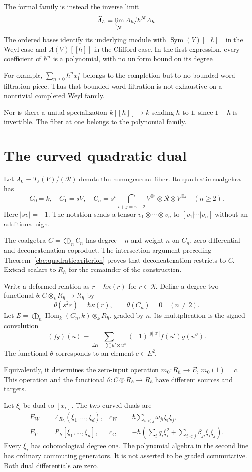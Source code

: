 The formal family is instead the inverse limit
\[
 \widehat A_\hbar=\varprojlim_N A_\hbar/\hbar^N A_\hbar.
\]
The ordered bases identify its underlying module with
$\operatorname{Sym}(V)[[\hbar]]$ in the Weyl case and
$\Lambda(V)[[\hbar]]$ in the Clifford case.
In the first expression, every coefficient of $\hbar^n$ is a polynomial, with no uniform bound on its degree.

For example, $\sum_{n\geq0}\hbar^n x_1^n$ belongs to the completion but to no bounded word-filtration piece.
Thus that bounded-word filtration is not exhaustive on a nontrivial completed Weyl family.

Nor is there a unital specialization $k[[\hbar]]\to k$ sending $\hbar$ to $1$, since $1-\hbar$ is invertible.
The fiber at one belongs to the polynomial family.

\section{The curved quadratic dual}
Let $A_0=T_k(V)/(\mathcal R)$ denote the homogeneous fiber.
Its quadratic coalgebra has
\[
 C_0=k,\quad C_1=sV,\quad
 C_n=s^n\!\bigcap_{i+j=n-2}
       V^{\otimes i}\otimes\mathcal R\otimes V^{\otimes j}
       \quad(n\geq2).
\]
Here $|sv|=-1$.
The notation sends a tensor $v_1\otimes\cdots\otimes v_n$ to $[v_1|\cdots|v_n]$ without an additional sign.

The coalgebra $C=\bigoplus_n C_n$ has degree $-n$ and weight $n$ on $C_n$, zero differential and deconcatenation coproduct.
The intersection argument preceding Theorem~\ref{cbc:quadratic:criterion} proves that deconcatenation restricts to $C$.
Extend scalars to $R_\hbar$ for the remainder of the construction.

Write a deformed relation as $r-\hbar\kappa(r)$ for $r\in\mathcal R$.
Define a degree-two functional $\theta:C\otimes_k R_\hbar\to R_\hbar$ by
\[
 \theta(s^2r)=\hbar\kappa(r),\qquad \theta(C_n)=0\quad(n\ne2).
\]
Let $E=\bigoplus_n\operatorname{Hom}_k(C_n,k)\otimes_k R_\hbar$, graded by $n$.
Its multiplication is the signed convolution
\[
 (fg)(u)=\sum_{\Delta u=\sum u'\otimes u''}
          (-1)^{|g||u'|}f(u')g(u'').
\]
The functional $\theta$ corresponds to an element $c\in E^2$.

Equivalently, it determines the zero-input operation $m_0:R_\hbar\to E$, $m_0(1)=c$.
This operation and the functional $\theta:C\otimes R_\hbar\to R_\hbar$ have different sources and targets.

Let $\xi_i$ be dual to $[x_i]$.
The two curved duals are
\begin{align}
 E_W&=\Lambda_{R_\hbar}(\xi_1,\ldots,\xi_d),&
 c_W&=\hbar\sum_{i<j}\omega_{ji}\xi_i\xi_j,\label{eq:cbc:weyl:curvature}\\
 E_{\mathrm{Cl}}&=R_\hbar[\xi_1,\ldots,\xi_d],&
 c_{\mathrm{Cl}}&=-\hbar\left(\sum_i q_i\xi_i^2+
                        \sum_{i<j}\beta_{ji}\xi_i\xi_j\right).
 \label{eq:cbc:clifford:curvature}
\end{align}
Every $\xi_i$ has cohomological degree one.
The polynomial algebra in the second line has ordinary commuting generators.
It is not asserted to be graded commutative.
Both dual differentials are zero.

